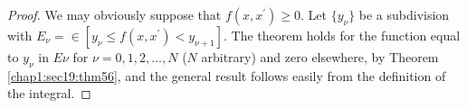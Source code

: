 \begin{proof}
  We may obviously suppose that $f(x,x^{'})\ge 0$.  Let $\big\{
  y_{\nu}\big\}$ be a subdivision with $E_{\nu} = \in [y_{\nu}\le
    f(x,x^{'})< y_{\nu+1}]$. The theorem holds for the function equal to
  $y_{\nu}$ in $E{\nu}$ for $\nu = 0, 1, 2, \dots , N$ ($N$ arbitrary) and
  zero elsewhere, by Theorem \ref{chap1:sec19:thm56}, and the general result follows easily
  from the definition of the integral. 
\end{proof}
